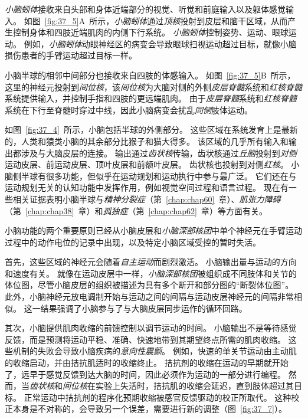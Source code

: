 \textit{小脑蚓体}接收来自头部和身体近端部分的视觉、听觉和前庭输入以及躯体感觉输入。
如图~\ref{fig:37_5}A~所示，\textit{小脑蚓体}通过\textit{顶核}投射到皮层和脑干区域，从而产生控制身体和四肢近端肌肉的内侧下行系统。
\textit{小脑蚓体}控制姿势、运动、眼球运动。
例如，\textit{小脑蚓体}动眼神经区的病变会导致眼球扫视运动超过目标，就像小脑损伤患者的手臂运动超过目标一样。


小脑半球的相邻中间部分也接收来自四肢的体感输入。
如图~\ref{fig:37_5}B~所示，这里的神经元投射到\textit{间位核}，该\textit{间位核}为大脑对侧的外侧\textit{皮层脊髓}系统和\textit{红核脊髓}系统提供输入，并控制手指和四肢的更远端肌肉。
由于\textit{皮层脊髓}系统和\textit{红核脊髓}系统在下行至脊髓时穿过中线，因此小脑病变会扰乱\textit{同侧}肢体运动。


如图~\ref{fig:37_4}~所示，小脑包括半球的外侧部分。
这些区域在系统发育上是最新的，人类和猿类小脑的其余部分比猴子和猫大得多。
该区域的几乎所有输入和输出都涉及与大脑皮层的连接。
输出通过\textit{齿状核}传输，齿状核通过\textit{丘脑}投射到\textit{对侧}运动皮层、前运动皮层、顶叶皮层和前额叶皮层。
齿状核也投射到对侧\textit{红核}。
小脑侧半球有很多功能，但似乎在运动规划和运动执行中参与最广泛。
它们还在与运动规划无关的认知功能中发挥作用，例如视觉空间过程和语言过程。
现在有一些相关证据表明小脑半球与\textit{精神分裂症}（第~\ref{chap:chap60}~章）、\textit{肌张力障碍}（第~\ref{chap:chap38}~章）和\textit{孤独症}（第~\ref{chap:chap62}~章）等方面有关。


小脑功能的两个重要原则已经从小脑皮层和\textit{小脑深部核团}中单个神经元在手臂运动过程中的动作电位的记录中出现，以及特定小脑区域受控的暂时失活。


首先，这些区域的神经元会随着\textit{自主运动}而剧烈激活。
小脑输出量与运动的方向和速度有关。
就像在运动皮层中一样，\textit{小脑深部核团}被组织成不同肢体和关节的体位图，尽管小脑皮层的组织被描述为具有多个断开和部分图的“断裂体位图”。
此外，小脑神经元放电调制开始与运动之间的间隔与运动皮层神经元的间隔非常相似。
这一结果强调了小脑参与了与大脑皮层同步运作的循环回路。


其次，小脑提供肌肉收缩的前馈控制以调节运动的时间。
小脑输出不是等待感觉反馈，而是预测将运动平稳、准确、快速地带到其期望终点所需的肌肉收缩。
这些机制的失败会导致小脑疾病的\textit{意向性震颤}。
例如，快速的单关节运动由主动肌的收缩启动，并由拮抗肌适时的收缩终止。
拮抗剂的收缩在运动的早期就开始了，远早于感觉反馈到达大脑的时间，因此必须作为运动的一部分进行编程。
然而，当\textit{齿状核}和\textit{间位核}在实验上失活时，拮抗肌的收缩会延迟，直到肢体超过其目标。
正常运动中拮抗剂的程序化预期收缩被感官反馈驱动的校正所取代。
这种校正本身是不对称的，会导致另一个误差，需要进行新的调整（图~\ref{fig:37_7}）。


